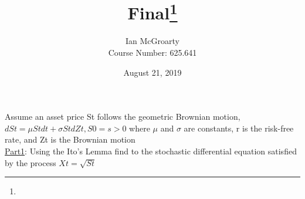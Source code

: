 \documentclass[12pt]{article}
\title{Final\thanks{}}
\author{Ian McGroarty \\
	Course Number: 625.641}
\date{August 21, 2019}
\newenvironment{problem}[3][Problem]{\begin{trivlist}
\item[\hskip \labelsep {\bfseries #1}\hskip \labelsep {\bfseries #2.}]}{\end{trivlist}}
\begin{document}
\maketitle

\newpage
\begin{problem}{1}. Assume an asset price St follows the geometric Brownian motion,
$dSt = \mu Stdt+\sigma StdZt, S0 = s > 0$ where $\mu$ and $\sigma$ are constants, r is the risk-free
rate, and Zt is the Brownian motion \\
\underline{Part1}: Using the Ito’s Lemma find to the stochastic differential equation satisfied by the process $Xt = \sqrt{St}$ 


\end{problem}
\end{document}
